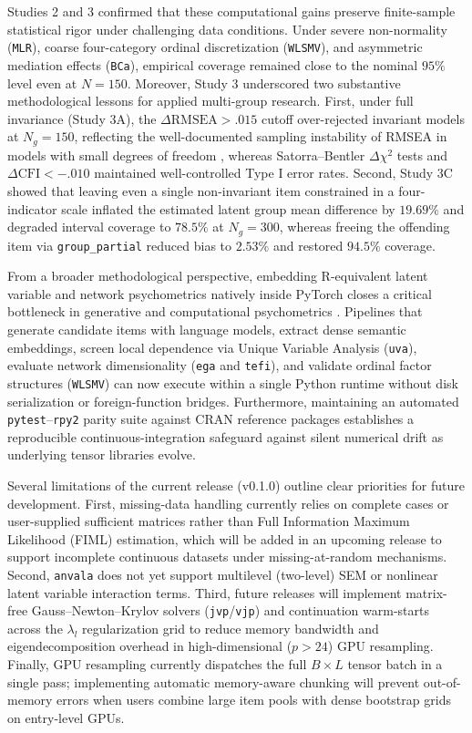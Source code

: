 ﻿\documentclass[12pt,letterpaper]{article}
\begin{document}
Studies 2 and 3 confirmed that these computational gains preserve finite-sample statistical rigor under challenging data conditions. Under severe non-normality (\texttt{MLR}), coarse four-category ordinal discretization (\texttt{WLSMV}), and asymmetric mediation effects (\texttt{BCa}), empirical coverage remained close to the nominal $95\%$ level even at $N = 150$. Moreover, Study 3 underscored two substantive methodological lessons for applied multi-group research. First, under full invariance (Study 3A), the $\Delta\mathrm{RMSEA} > .015$ cutoff \parencite{chen2007} over-rejected invariant models at $N_g = 150$, reflecting the well-documented sampling instability of RMSEA in models with small degrees of freedom \parencite{kenny2015}, whereas Satorra--Bentler $\Delta\chi^2$ tests and $\Delta\mathrm{CFI} < -.010$ maintained well-controlled Type I error rates. Second, Study 3C showed that leaving even a single non-invariant item constrained in a four-indicator scale inflated the estimated latent group mean difference by $19.69\%$ and degraded interval coverage to $78.5\%$ at $N_g = 300$, whereas freeing the offending item via \texttt{group\_partial} reduced bias to $2.53\%$ and restored $94.5\%$ coverage.

From a broader methodological perspective, embedding R-equivalent latent variable and network psychometrics natively inside PyTorch closes a critical bottleneck in generative and computational psychometrics \parencite{russelllasalandra2026, vondavier2021}. Pipelines that generate candidate items with language models, extract dense semantic embeddings, screen local dependence via Unique Variable Analysis (\texttt{uva}), evaluate network dimensionality (\texttt{ega} and \texttt{tefi}), and validate ordinal factor structures (\texttt{WLSMV}) can now execute within a single Python runtime without disk serialization or foreign-function bridges. Furthermore, maintaining an automated \texttt{pytest}--\texttt{rpy2} parity suite against CRAN reference packages establishes a reproducible continuous-integration safeguard against silent numerical drift as underlying tensor libraries evolve.

Several limitations of the current release (v0.1.0) outline clear priorities for future development. First, missing-data handling currently relies on complete cases or user-supplied sufficient matrices rather than Full Information Maximum Likelihood (FIML) estimation, which will be added in an upcoming release to support incomplete continuous datasets under missing-at-random mechanisms. Second, \texttt{anvala} does not yet support multilevel (two-level) SEM or nonlinear latent variable interaction terms. Third, future releases will implement matrix-free Gauss--Newton--Krylov solvers (\texttt{jvp}/\texttt{vjp}) and continuation warm-starts across the $\lambda_l$ regularization grid to reduce memory bandwidth and eigendecomposition overhead in high-dimensional ($p > 24$) GPU resampling. Finally, GPU resampling currently dispatches the full $B \times L$ tensor batch in a single pass; implementing automatic memory-aware chunking will prevent out-of-memory errors when users combine large item pools with dense bootstrap grids on entry-level GPUs.
\end{document}
